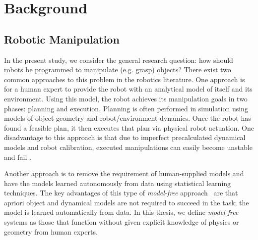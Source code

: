 \chapter{Background}
\label{chap2}

\section{Robotic Manipulation}

In the present study, we consider the general research question: how should robots be programmed to manipulate (e.g. grasp) objects? 
There exist two common approaches to this problem in the robotics literature.
One approach is for a human expert to provide the robot with an analytical model of itself and its environment. 
Using this model, the robot achieves its manipulation goals in two phases: planning and execution.
Planning is often performed in simulation using models of object geometry and robot/environment dynamics.
Once the robot has found a feasible plan, it then executes that plan via physical robot actuation.
One disadvantage to this approach is that due to imperfect precalculated dynamical models and robot calibration, executed manipulations can easily become unstable and fail \cite{dang2012tactile}.

Another approach is to remove the requirement of human-supplied models and have the models learned autonomously from data using statistical learning techniques.
The key advantages of this type of \emph{model-free} approach~\cite{Spall1998,hornung2014anomaly} are that apriori object and dynamical models are not required to succeed in the task; the model is learned automatically from data.
In this thesis, we define \emph{model-free} \cite{Spall1998} systems as those that function without given explicit knowledge of physics or geometry from human experts.





